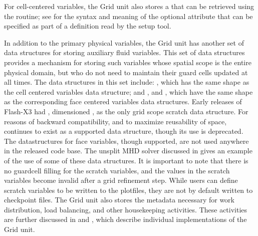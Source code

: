 For cell-centered variables, the \unit{Grid} unit
also stores a  that can be retrieved using 
the  routine; see
 for the syntax and meaning
of the optional  attribute that can be specified
as part of a  definition read by the setup tool.

In addition to the primary physical variables, the \unit{Grid} unit has
another set of data structures for storing auxiliary fluid variables. 
This set of data structures provides a mechanism for storing such
variables whose spatial scope is the entire 
physical domain, but who do not need to maintain their guard cells
updated at all times. The data structures in this set include:
, which has the same shape as the cell
centered variables data structure;  and ,
 and , which have
the same shape as the corresponding face centered variables
data structures. Early releases of Flash-X3 had ,
dimensioned
, as  
the only grid scope scratch data structure.  For reasons of backward
compatibility, and to maximize reusability of space, 
continues to exist as a supported data structure, though its use is
deprecated.  The
datastructures  
for face variables, though supported, are not used anywhere in the
released code base.  The unsplit MHD solver
 discussed in  gives an
example of the use of some of these data structures. It is important
to note that there is no guardcell filling for the scratch variables,
and the values in the scratch variables become invalid after a grid
refinement step. While users can define scratch variables to be
written to the plotfiles, they are not by default written to 
checkpoint files. The \unit{Grid} unit also stores the metadata
necessary for work distribution, load balancing, and other
housekeeping activities. These activities are further discussed in 
 and , which describe
individual implementations of the \unit{Grid} unit.


